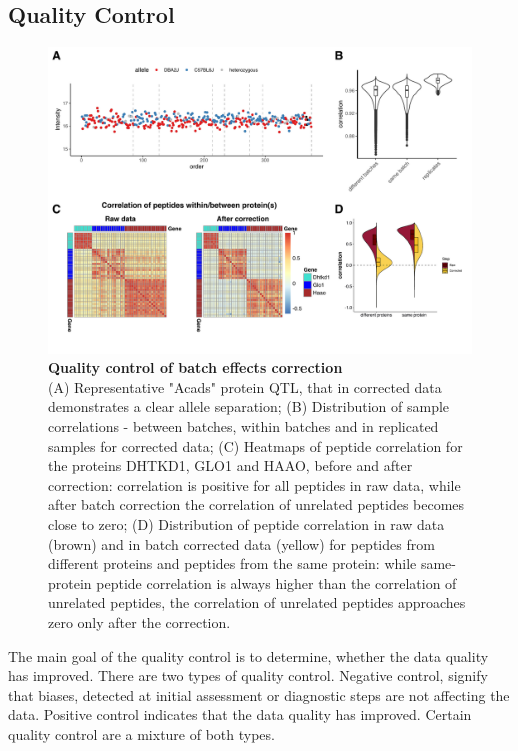 \documentclass[num-refs]{wiley-article}
\begin{document}
\subsection{Quality Control}
\begin{figure}[hbt]
	\includegraphics[width=\textwidth]{figures/Fig5_quality_control2.pdf}
	
	\caption{\textbf{Quality control of batch effects correction}  \\
		\footnotesize
		(A) Representative "Acads" protein QTL, that in corrected data demonstrates a clear allele separation; (B) Distribution of sample correlations - between batches, within batches and in replicated samples for corrected data; (C)  Heatmaps of peptide correlation for the proteins DHTKD1, GLO1 and HAAO, before and after correction: correlation is positive for all peptides in raw data, while after batch correction the correlation of unrelated peptides becomes close to zero; (D) Distribution of peptide correlation in raw data (brown) and in batch corrected data (yellow) for peptides from different proteins and peptides from the same protein: while same-protein peptide correlation is always higher than the correlation of unrelated peptides, the correlation of unrelated peptides approaches zero only after the correction.}
	\label{fig:batch_fig6_QualityControl}
\end{figure}

The main goal of the quality control is to determine, whether the data quality has improved. There are two types of quality control. Negative control, signify that biases, detected at initial assessment or diagnostic steps are not affecting the data. Positive control indicates that the data quality has improved. Certain quality control are a mixture of both types.
\end{document}
